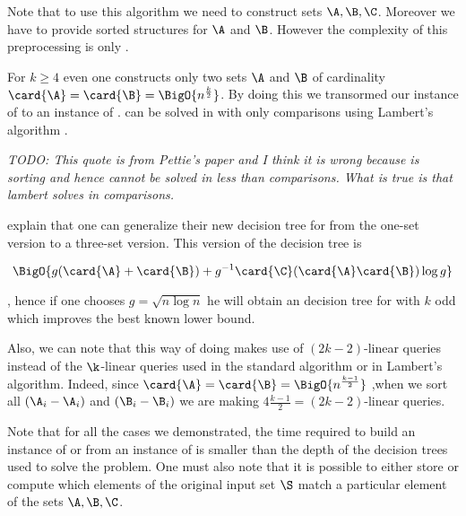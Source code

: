 Note that to use this algorithm we need to construct sets \(\A,\B,\C\).
Moreover we have to provide sorted structures for \(\A\) and \(\B\). However
the complexity of this preprocessing is only .

For \(k \ge 4\) even one constructs only two sets \(\A\) and \(\B\) of
cardinality \(\card{\A} = \card{\B} = \BigO{n^{\frac{k}{2}}}\). By doing this
we transormed our instance of \kLDT to an instance of \twoSUM. \twoSUM can be
solved in  with only 
comparisons using Lambert's algorithm \cite{lambert:1990}.

\emph{TODO: This quote is from Pettie's paper and I think it is wrong because
\twoSUM is sorting and hence cannot be solved in less than 
comparisons. What is true is that lambert solves \fourSUM in 
comparisons.}

\citet*{gronlund:2014} explain that one can generalize their new decision tree
for \threeSUM from the one-set version to a three-set version. This version of
the decision tree is

\begin{displaymath}
\BigO{g(\card{\A}+\card{\B}) + g^{-1}\card{\C}(\card{\A}\card{\B})\log g}
\end{displaymath}

, hence if one chooses \(g = \sqrt{n \log n}\) he will obtain an
 decision tree for \kLDT with $k$ odd
which improves the best known lower bound.

Also, we can note that this way of doing makes use of \((2k-2)\)-linear queries
instead of the \(\k\)-linear queries used in the standard \threeSUM
algorithm or in Lambert's algorithm. Indeed, since \(\card{\A} = \card{\B} =
\BigO{n^{\frac{k-1}{2}}}\) ,when we sort all \((\A_i - \A_i)\) and \((\B_i -
\B_i)\) we are making \(4 \frac{k-1}{2} = (2k-2)\)-linear queries.

Note that for all the cases we demonstrated, the time required to build an
instance of \twoSUM or \threeSUM from an instance of \kLDT is smaller than the
depth of the decision trees used to solve the problem. One must also note that
it is possible to either store or compute which elements of the original input
set \(\S\) match a particular element of the sets \(\A,\B,\C\).
